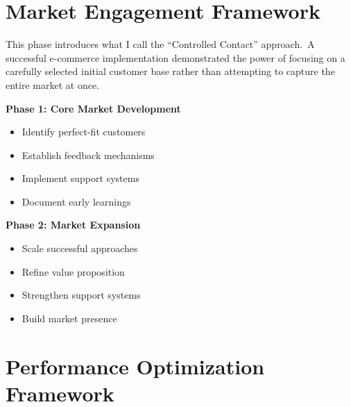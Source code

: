 \section{Market Engagement Framework}\label{sec:market-engagement}

This phase introduces what I call the ``Controlled Contact'' approach.\ A successful e-commerce implementation demonstrated the power of focusing on a carefully selected initial customer base rather than attempting to capture the entire market at once.


\begin{tcolorbox}[colback=white,colframe=primarydark,title=\textbf{Market Engagement Strategy}]
\textbf{Phase 1: Core Market Development}
\begin{itemize}
    \item Identify perfect-fit customers
    \item Establish feedback mechanisms
    \item Implement support systems
    \item Document early learnings
\end{itemize}

\textbf{Phase 2: Market Expansion}
\begin{itemize}
    \item Scale successful approaches
    \item Refine value proposition
    \item Strengthen support systems
    \item Build market presence
\end{itemize}
\end{tcolorbox}

\section{Performance Optimization Framework}\label{sec:performance-optimization}

